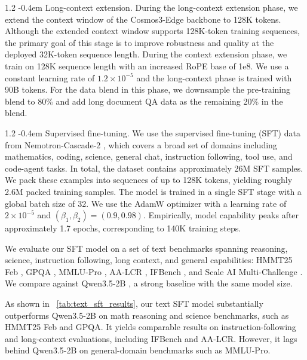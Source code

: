 \documentclass{llmxive}
\makeatletter
\providecommand{\paragraph}{  \@startsection{paragraph}{4}{\z@}    {1\baselineskip \@plus .2\baselineskip}    {-0.4em}    {\normalfont\normalsize\bfseries}}
\makeatother
\begin{document}
\paragraph{Long-context extension.}
During the long-context extension phase, we extend the context window of the Cosmos3-Edge backbone to 128K tokens. Although the extended context window supports 128K-token training sequences, the primary goal of this stage is to improve robustness and quality at the deployed 32K-token sequence length. During the context extension phase, we train on 128K sequence length with an increased RoPE base of 1e8. We use a constant learning rate of $1.2\times 10^{-5}$ and the long-context phase is trained with 90B tokens. For the data blend in this phase, we downsample the pre-training blend to 80\% and add long document QA data as the remaining 20\% in the blend.

\paragraph{Supervised fine-tuning.}
We use the supervised fine-tuning (SFT) data from Nemotron-Cascade-2 \citep{yang2026nemotroncascade2}, which covers a broad set of domains including mathematics, coding, science, general chat, instruction following, tool use, and code-agent tasks. In total, the dataset contains approximately 26M SFT samples. We pack these examples into sequences of up to 128K tokens, yielding roughly 2.6M packed training samples. The model is trained in a single SFT stage with a global batch size of 32. We use the AdamW optimizer with a learning rate of $2\times10^{-5}$ and $(\beta_1,\beta_2)=(0.9,0.98)$. Empirically, model capability peaks after approximately 1.7 epochs, corresponding to 140K training steps.

We evaluate our SFT model on a set of text benchmarks spanning reasoning, science, instruction following, long context, and general capabilities: HMMT25 Feb \citep{hmmt2025feb}, GPQA \citep{rein2023gpqa}, MMLU-Pro \citep{wang2024mmlupro}, AA-LCR \citep{artificialanalysis2025lcr}, IFBench \citep{pyatkin2025generalizing}, and Scale AI Multi-Challenge \citep{sirdeshmukh2025multichallenge}. We compare against Qwen3.5-2B \citep{qwen3_5towards}, a strong baseline with the same model size.

As shown in ~\cref{tab:text_sft_results}, our text SFT model substantially outperforms Qwen3.5-2B on math reasoning and science benchmarks, such as HMMT25 Feb and GPQA. It yields comparable results on instruction-following and long-context evaluations, including IFBench and AA-LCR. However, it lags behind Qwen3.5-2B on general-domain benchmarks such as MMLU-Pro.
\end{document}
